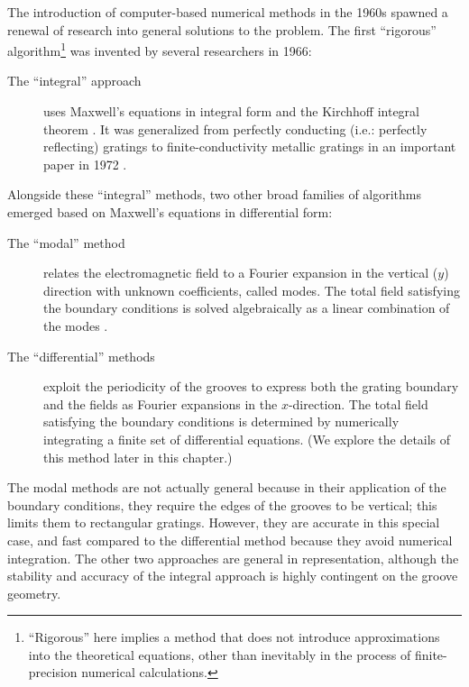 The introduction of computer-based numerical methods in the 1960s spawned a renewal of research into general solutions to the problem.  The first ``rigorous'' algorithm\footnote{``Rigorous'' here implies a method that does not introduce approximations into the theoretical equations, other than inevitably in the process of finite-precision numerical calculations.} was invented by several researchers in 1966:
\begin{description}
\item[The ``integral'' approach] uses Maxwell's equations in integral form and the Kirchhoff integral theorem \cite{Pet66,Wir69,Pav70}.  It was generalized from perfectly conducting (i.e.: perfectly reflecting) gratings to finite-conductivity metallic gratings in an important paper in 1972 \cite{May72}.
\end{description}
Alongside these ``integral'' methods, two other broad families of algorithms emerged based on Maxwell's equations in differential form:
\begin{description}
\item[The ``modal'' method] relates the electromagnetic field to a Fourier expansion in the vertical ($y$) direction with unknown coefficients, called modes. The total field satisfying the boundary conditions is solved algebraically as a linear combination of the modes \cite{Bot81,Bot81a,And81}.
\item[The ``differential'' methods] exploit the periodicity of the grooves to express both the grating boundary and the fields as Fourier expansions in the $x$-direction. The total field satisfying the boundary conditions is determined by numerically integrating a finite set of differential equations. (We explore the details of this method later in this chapter.)
\end{description}
The modal methods are not actually general because in their application of the boundary conditions, they require the edges of the grooves to be vertical; this limits them to rectangular gratings.  However, they are accurate in this special case, and fast compared to the differential method because they avoid numerical integration.  
The other two approaches are general in representation, although the stability and accuracy of the integral approach is highly contingent on the groove geometry.

